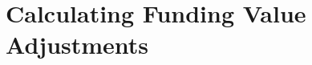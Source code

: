\documentclass[../../main.tex]{subfiles}
\begin{document}
    \part{Calculating Funding Value Adjustments}
    
    
\end{document}
